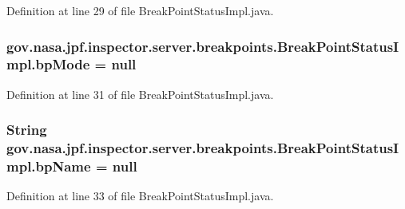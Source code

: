 Definition at line 29 of file Break\+Point\+Status\+Impl.\+java.

\subsubsection[{\texorpdfstring{bp\+Mode}{bpMode}}]{ gov.\+nasa.\+jpf.\+inspector.\+server.\+breakpoints.\+Break\+Point\+Status\+Impl.\+bp\+Mode = null\hspace{0.3cm}{\ttfamily [private]}}\hypertarget{classgov_1_1nasa_1_1jpf_1_1inspector_1_1server_1_1breakpoints_1_1_break_point_status_impl_a0c6b99bcb55045aa22cf356e527a0a3c}{}\label{classgov_1_1nasa_1_1jpf_1_1inspector_1_1server_1_1breakpoints_1_1_break_point_status_impl_a0c6b99bcb55045aa22cf356e527a0a3c}


Definition at line 31 of file Break\+Point\+Status\+Impl.\+java.

\subsubsection[{\texorpdfstring{bp\+Name}{bpName}}]{\setlength{\rightskip}{0pt plus 5cm}String gov.\+nasa.\+jpf.\+inspector.\+server.\+breakpoints.\+Break\+Point\+Status\+Impl.\+bp\+Name = null\hspace{0.3cm}{\ttfamily [private]}}\hypertarget{classgov_1_1nasa_1_1jpf_1_1inspector_1_1server_1_1breakpoints_1_1_break_point_status_impl_adb7e7ddd5666450f66f03016ea2ac91c}{}\label{classgov_1_1nasa_1_1jpf_1_1inspector_1_1server_1_1breakpoints_1_1_break_point_status_impl_adb7e7ddd5666450f66f03016ea2ac91c}


Definition at line 33 of file Break\+Point\+Status\+Impl.\+java.

